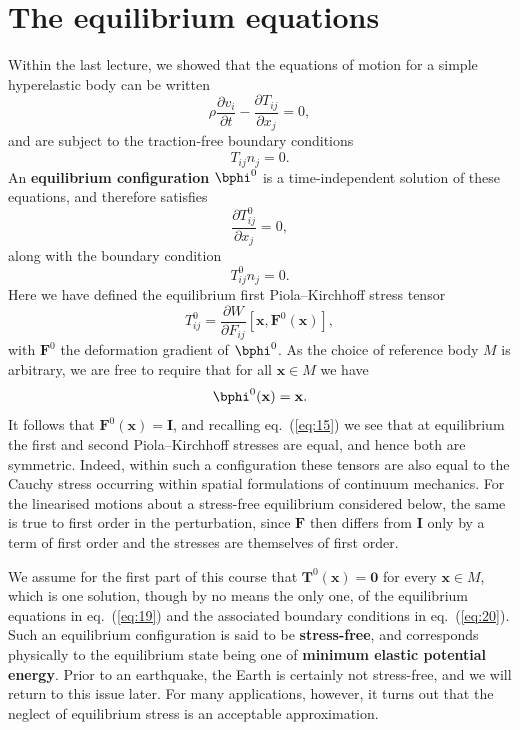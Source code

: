 \section*{The equilibrium equations}

Within the last lecture, we showed that the equations of motion for a simple hyperelastic body can be written
\begin{equation}
\rho\frac{\partial v_{i}}{\partial t} - \frac{\partial T_{ij}}{\partial x_{j}} = 0,
\label{eq:17}
\end{equation}
and are subject to the traction-free boundary conditions
\begin{equation}
T_{ij}\hat{n}_{j} = 0.
\label{eq:18}
\end{equation}
An \textbf{equilibrium configuration} $\bphi^0$ is a time-independent solution of these equations, and therefore satisfies
\begin{equation}
\frac{\partial T_{ij}^{0}}{\partial x_{j}} = 0,
\label{eq:19}
\end{equation}
along with the boundary condition
\begin{equation}
T_{ij}^{0}\hat{n}_{j} = 0.
\label{eq:20}
\end{equation}
Here we have defined the equilibrium first Piola--Kirchhoff stress tensor
\begin{equation}
T_{ij}^{0} = \frac{\partial W}{\partial F_{ij}}[\mathbf{x}, \mathbf{F}^0(\mathbf{x})],
\label{eq:21}
\end{equation}
with $\mathbf{F}^0$ the deformation gradient of $\bphi^0$. 
As the choice of reference body $M$ is arbitrary, we are free to require that for all $\mathbf{x} \in M$ we have
\begin{equation}
\bphi^0(\mathbf{x}) = \mathbf{x}.
\label{eq:22}
\end{equation}
It follows that $\mathbf{F}^0(\mathbf{x}) = \mathbf{I}$, and recalling eq.~(\ref{eq:15}) we see that at equilibrium the first 
and second Piola--Kirchhoff stresses are equal, and hence both are symmetric. Indeed, within such a configuration these
tensors are also equal to the Cauchy stress occurring within spatial formulations of continuum mechanics. For the linearised motions 
about a stress-free equilibrium considered below, the same is true to first order in the perturbation, since $\mathbf{F}$ then differs 
from $\mathbf{I}$ only by a term of first order and the stresses are themselves of first order.



We assume for the first part of this course that $\mathbf{T}^0(\mathbf{x}) = \mathbf{0}$ for every $\mathbf{x} \in M$,
 which is one solution, though by no means the only one, of the equilibrium equations in eq.~(\ref{eq:19}) and the associated boundary conditions in eq.~(\ref{eq:20}). 
 Such an equilibrium configuration is said to be \textbf{stress-free}, and corresponds physically to the equilibrium state being one 
 of \textbf{minimum elastic potential energy}. Prior to an earthquake, the Earth is certainly not stress-free, and we will return to this 
 issue later. For many applications, however, it turns out that the neglect of equilibrium stress is an acceptable approximation.

